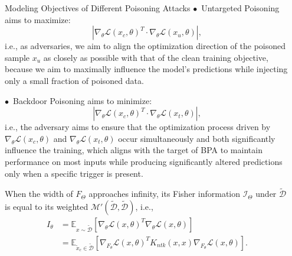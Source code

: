 \documentclass[final,hyperref={pdfpagelabels=false}]{beamer}
\newcommand{\shrink}{-15pt}
\begin{document}
\begin{frame}[t]
\begin{columns}[t]
  \begin{column}{.02\textwidth}\end{column} %

  \begin{column}{.24\textwidth} %
    \begin{block}{Modeling Objectives of Different Poisoning Attacks}
$\bullet$~Untargeted Poisoning aims to maximize:
\begin{equation}
|{\nabla_{\theta}{\mathcal{L}(x_c,\theta)}^T\cdot\nabla_{\theta}{\mathcal{L}(x_u,\theta)}}|,
\end{equation}
i.e., as adversaries, we aim to align the optimization direction of
the poisoned sample $x_u$ as closely as possible with that of the
clean training objective, because we aim to maximally influence the
model’s predictions while injecting only a small fraction of poisoned
data.

$\bullet$~Backdoor Poisoning aims to minimize:
\begin{equation}
|{\nabla_{\theta}{\mathcal{L}(x_c,\theta)}^T\cdot\nabla_{\theta}{\mathcal{L}(x_t,\theta)}}|,
\end{equation}
i.e., the adversary aims to ensure that the optimization process
driven by $\nabla_{\theta}{\mathcal{L}(x_c,\theta)}$ and
$\nabla_{\theta}{\mathcal{L}(x_t,\theta)}$ occur simultaneously and
both significantly influence the training, which aligns with the
target of BPA to maintain performance on most inputs while producing
significantly altered predictions only when a specific trigger is
present.
    \end{block}

\begin{theorem}\label{th:fisher-k}
  When the width of $F_{\Theta}$ approaches infinity, its Fisher information
  $\mathcal{I}_{\Theta}$ under $\mathcal{\tilde{D}}$ is equal to its
  weighted $\mathcal{M}'(\tilde{\mathcal{D}},\tilde{\mathcal{D}})$, i.e.,
  \begin{equation}\label{eq:fisher}
    \begin{aligned}
 I_{\theta}&= \mathbb{E}_{x\sim \tilde{\mathcal{D}}} \left[\nabla_{\theta}\mathcal{L}(x,\theta)^{T}\nabla_{\theta}\mathcal{L}(x,\theta)\right]\\
    &=\mathbb{E}_{\tilde{x}_{c}\in \tilde{\mathcal{D}}}\left[\nabla_{F_{\theta}}\mathcal{L}(x,\theta)^{T}K_{ntk}(x,x)\nabla_{F_{\theta}}\mathcal{L}(x,\theta)\right].
    \end{aligned}
  \end{equation}
\end{theorem}


\end{column}
\end{columns}
\end{frame}
\end{document}
